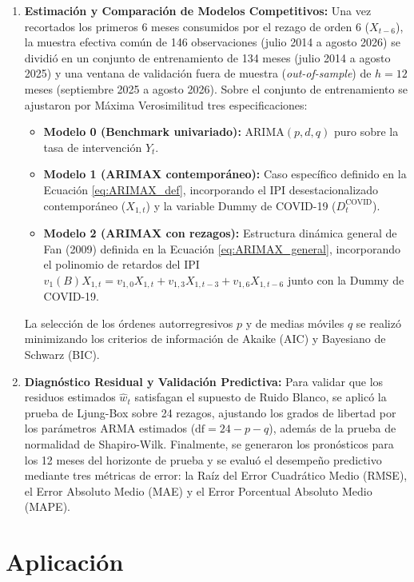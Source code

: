 \documentclass[11pt,letterpaper]{article}
\begin{document}
\begin{enumerate}
    \item \textbf{Estimación y Comparación de Modelos Competitivos:}
    Una vez recortados los primeros 6 meses consumidos por el rezago de orden 6 ($X_{t-6}$), la muestra efectiva común de 146 observaciones (julio 2014 a agosto 2026) se dividió en un conjunto de entrenamiento de 134 meses (julio 2014 a agosto 2025) y una ventana de validación fuera de muestra (\textit{out-of-sample}) de $h = 12$ meses (septiembre 2025 a agosto 2026). Sobre el conjunto de entrenamiento se ajustaron por Máxima Verosimilitud tres especificaciones:
    \begin{itemize}
        \item \textbf{Modelo 0 (Benchmark univariado):} $\text{ARIMA}(p,d,q)$ puro sobre la tasa de intervención $Y_t$.
        \item \textbf{Modelo 1 (ARIMAX contemporáneo):} Caso específico definido en la Ecuación \ref{eq:ARIMAX_def}, incorporando el IPI desestacionalizado contemporáneo ($X_{1,t}$) y la variable Dummy de COVID-19 ($D_t^{\text{COVID}}$).
        \item \textbf{Modelo 2 (ARIMAX con rezagos):} Estructura dinámica general de Fan (2009) definida en la Ecuación \ref{eq:ARIMAX_general}, incorporando el polinomio de retardos del IPI $v_1(B)X_{1,t} = v_{1,0}X_{1,t} + v_{1,3}X_{1,t-3} + v_{1,6}X_{1,t-6}$ junto con la Dummy de COVID-19.
    \end{itemize}
    La selección de los órdenes autorregresivos $p$ y de medias móviles $q$ se realizó minimizando los criterios de información de Akaike (AIC) y Bayesiano de Schwarz (BIC).

    \item \textbf{Diagnóstico Residual y Validación Predictiva:}
    Para validar que los residuos estimados $\hat{w}_t$ satisfagan el supuesto de Ruido Blanco, se aplicó la prueba de Ljung-Box sobre 24 rezagos, ajustando los grados de libertad por los parámetros ARMA estimados ($\text{df} = 24 - p - q$), además de la prueba de normalidad de Shapiro-Wilk. Finalmente, se generaron los pronósticos para los 12 meses del horizonte de prueba y se evaluó el desempeño predictivo mediante tres métricas de error: la Raíz del Error Cuadrático Medio (RMSE), el Error Absoluto Medio (MAE) y el Error Porcentual Absoluto Medio (MAPE).
\end{enumerate}


\section{Aplicación}
\end{document}
